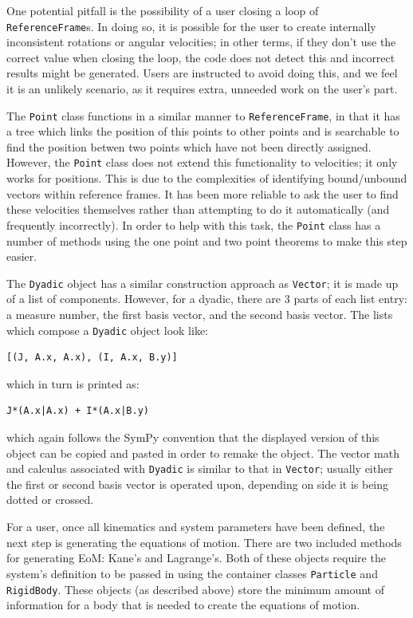 \documentclass[twocolumn,10pt]{asme2e}
\begin{document}
One potential pitfall is the possibility of a user closing a loop of
\verb|ReferenceFrame|s.
In doing so, it is possible for the user to create internally inconsistent
rotations or angular velocities; in other terms, if they don't use the correct
value when closing the loop, the code does not detect this and incorrect
results might be generated.
Users are instructed to avoid doing this, and we feel it is an unlikely
scenario, as it requires extra, unneeded work on the user's part.

The \verb|Point| class functions in a similar manner to \verb|ReferenceFrame|,
in that it has a tree which links the position of this points to other points
and is searchable to find the position betwen two points which have not been
directly assigned.
However, the \verb|Point| class does not extend this functionality to
velocities; it only works for positions.
This is due to the complexities of identifying bound/unbound vectors within
reference frames.
It has been more reliable to ask the user to find these velocities themselves
rather than attempting to do it automatically (and frequently incorrectly).
In order to help with this task, the \verb|Point| class has a number of methods
using the one point and two point theorems \cite{Kane1985} to make this step
easier.

The \verb|Dyadic| object has a similar construction approach as \verb|Vector|;
it is made up of a list of components.
However, for a dyadic, there are 3 parts of each list entry: a measure number,
the first basis vector, and the second basis vector.
The lists which compose a \verb|Dyadic| object look like:
\begin{verbatim}
[(J, A.x, A.x), (I, A.x, B.y)]
\end{verbatim}
which in turn is printed as:
\begin{verbatim}
J*(A.x|A.x) + I*(A.x|B.y)
\end{verbatim}
which again follows the SymPy convention that the displayed version of this
object can be copied and pasted in order to remake the object.
The vector math and calculus associated with \verb|Dyadic| is similar to that
in \verb|Vector|; usually either the first or second basis vector is operated
upon, depending on side it is being dotted or crossed.

For a user, once all kinematics and system parameters have been defined, the
next step is generating the equations of motion.
There are two included methods for generating EoM: Kane's and Lagrange's.
Both of these objects require the system's definition to be passed in using the
container classes \verb|Particle| and \verb|RigidBody|.
These objects (as described above) store the minimum amount of information for
a body that is needed to create the equations of motion.
\end{document}

